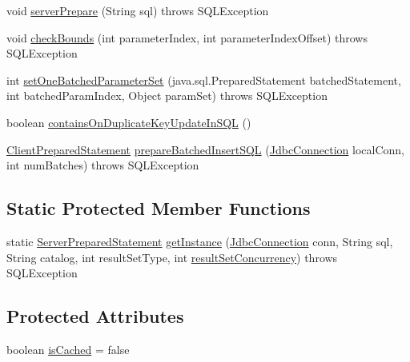 \begin{DoxyCompactItemize}
\item 
void \mbox{\hyperlink{classcom_1_1mysql_1_1cj_1_1jdbc_1_1_server_prepared_statement_aac9d9eb5e0c2d0aee524205be1c80ec8}{server\+Prepare}} (String sql)  throws S\+Q\+L\+Exception 
\item 
void \mbox{\hyperlink{classcom_1_1mysql_1_1cj_1_1jdbc_1_1_server_prepared_statement_ae05f9bb12438e3edb3b0d9b726f3799c}{check\+Bounds}} (int parameter\+Index, int parameter\+Index\+Offset)  throws S\+Q\+L\+Exception 
\item 
int \mbox{\hyperlink{classcom_1_1mysql_1_1cj_1_1jdbc_1_1_server_prepared_statement_a91ef33751560d9b6961a1526710b7d76}{set\+One\+Batched\+Parameter\+Set}} (java.\+sql.\+Prepared\+Statement batched\+Statement, int batched\+Param\+Index, Object param\+Set)  throws S\+Q\+L\+Exception 
\item 
boolean \mbox{\hyperlink{classcom_1_1mysql_1_1cj_1_1jdbc_1_1_server_prepared_statement_aee0399fcf1e0c3fd1dd8b05dbff5bec9}{contains\+On\+Duplicate\+Key\+Update\+In\+S\+QL}} ()
\item 
\mbox{\hyperlink{classcom_1_1mysql_1_1cj_1_1jdbc_1_1_client_prepared_statement}{Client\+Prepared\+Statement}} \mbox{\hyperlink{classcom_1_1mysql_1_1cj_1_1jdbc_1_1_server_prepared_statement_a7bd2ee73987a42a93a0cba6b04fd3923}{prepare\+Batched\+Insert\+S\+QL}} (\mbox{\hyperlink{interfacecom_1_1mysql_1_1cj_1_1jdbc_1_1_jdbc_connection}{Jdbc\+Connection}} local\+Conn, int num\+Batches)  throws S\+Q\+L\+Exception 
\end{DoxyCompactItemize}
\subsection*{Static Protected Member Functions}
\begin{DoxyCompactItemize}
\item 
static \mbox{\hyperlink{classcom_1_1mysql_1_1cj_1_1jdbc_1_1_server_prepared_statement}{Server\+Prepared\+Statement}} \mbox{\hyperlink{classcom_1_1mysql_1_1cj_1_1jdbc_1_1_server_prepared_statement_a6108da4da92d15f3ed8bc5ceba8c3005}{get\+Instance}} (\mbox{\hyperlink{interfacecom_1_1mysql_1_1cj_1_1jdbc_1_1_jdbc_connection}{Jdbc\+Connection}} conn, String sql, String catalog, int result\+Set\+Type, int \mbox{\hyperlink{classcom_1_1mysql_1_1cj_1_1jdbc_1_1_statement_impl_a8cf4c2416671121707036791a1cd92b7}{result\+Set\+Concurrency}})  throws S\+Q\+L\+Exception 
\end{DoxyCompactItemize}
\subsection*{Protected Attributes}
\begin{DoxyCompactItemize}
\item 
boolean \mbox{\hyperlink{classcom_1_1mysql_1_1cj_1_1jdbc_1_1_server_prepared_statement_a8bdf909000acc54403f9d3f32d0ecc73}{is\+Cached}} = false
\end{DoxyCompactItemize}
